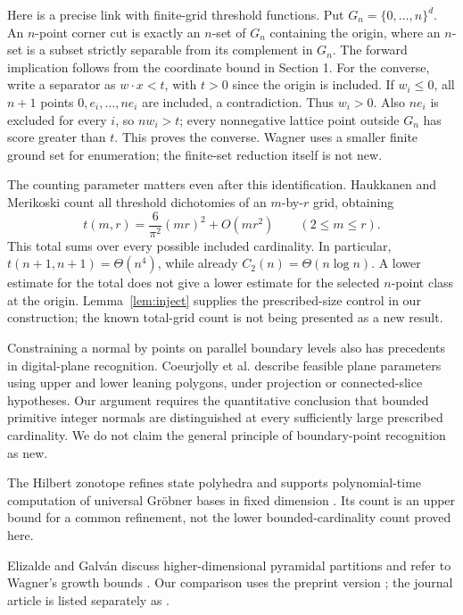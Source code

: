\documentclass[11pt,a4paper]{article}
\theoremstyle{remark}
\begin{document}
Here is a precise link with finite-grid threshold functions.
Put \(G_n=\{0,\ldots,n\}^d\). An \(n\)-point corner cut is exactly
an \(n\)-set of \(G_n\) containing the origin, where an \(n\)-set is
a subset strictly separable from its complement in \(G_n\).
The forward implication follows from the coordinate bound in Section 1.
For the converse, write a separator as \(w\cdot x<t\), with \(t>0\)
since the origin is included. If \(w_i\leq0\), all \(n+1\) points
\(0,e_i,\ldots,ne_i\) are included, a contradiction. Thus \(w_i>0\).
Also \(ne_i\) is excluded for every \(i\), so \(nw_i>t\);
every nonnegative lattice point outside \(G_n\) has score greater
than \(t\). This proves the converse. Wagner
\cite[Section 3.2]{W03} uses a smaller finite ground set for enumeration;
the finite-set reduction itself is not new.

The counting parameter matters even after this identification.
Haukkanen and Merikoski \cite[Equations (1) and (9)]{HM} count all
threshold dichotomies of an \(m\)-by-\(r\) grid, obtaining
\[
 t(m,r)=\frac6{\pi^2}(mr)^2+O(mr^2)\qquad(2\leq m\leq r).
\]
This total sums over every possible included cardinality. In particular,
\(t(n+1,n+1)=\Theta(n^4)\), while already
\(C_2(n)=\Theta(n\log n)\). A lower estimate for the total does not
give a lower estimate for the selected \(n\)-point class at the origin.
Lemma~\ref{lem:inject} supplies the prescribed-size control in our
construction; the known total-grid count is not being presented as
a new result.

Constraining a normal by points on parallel boundary levels also has
precedents in digital-plane recognition. Coeurjolly et al.
\cite[Proposition 6 and Theorems 8 and 11]{CSD}
describe feasible plane parameters using upper and lower leaning polygons,
under projection or connected-slice hypotheses.
Our argument requires the quantitative conclusion that bounded primitive
integer normals are distinguished at every sufficiently large prescribed
cardinality. We do not claim the general principle of boundary-point
recognition as new.

The Hilbert zonotope refines state polyhedra and supports polynomial-time
computation of universal Gr\"obner bases in fixed dimension
\cite[Proposition 3.2 and Theorem 3.5]{BOT}.
Its count is an upper bound for a common refinement, not the lower
bounded-cardinality count proved here.

Elizalde and Galv\'an discuss higher-dimensional pyramidal partitions
and refer to Wagner's growth bounds \cite[Section 8.2]{EGpre}.
Our comparison uses the preprint version \cite{EGpre}; the journal
article is listed separately as \cite{EGjournal}.
\end{document}
